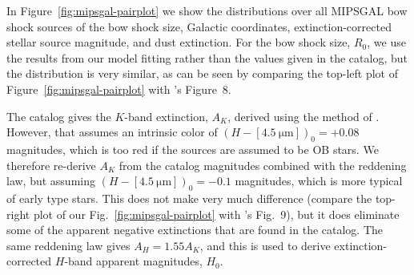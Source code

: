\documentclass[useAMS, usenatbib, a4paper]{mnras}
\begin{document}
In Figure~\ref{fig:mipsgal-pairplot} we show the distributions over
all MIPSGAL bow shock sources of the bow shock size, Galactic
coordinates, extinction-corrected stellar source magnitude, and dust
extinction.  For the bow shock size, \(R_0\), we use the results from
our model fitting rather than the values given in the
\citet{Kobulnicky:2016a} catalog, but the distribution is very
similar, as can be seen by comparing the top-left plot of
Figure~\ref{fig:mipsgal-pairplot} with \citeauthor{Kobulnicky:2016a}'s
Figure~8.

The catalog gives the \(K\)-band extinction, \(A_K\), derived using
the method of \citet{Majewski:2011a}. However, that assumes an
intrinsic color of \((H - [\SI{4.5}{\um}])_0 = +0.08\) magnitudes,
which is too red if the sources are assumed to be OB stars.  We
therefore re-derive \(A_K\) from the catalog magnitudes combined with
the \citet{Indebetouw:2005a} reddening law, but assuming
\((H - [\SI{4.5}{\um}])_0 = -0.1\) magnitudes, which is more typical
of early type stars.  This does not make very much difference (compare
the top-right plot of our Fig.~\ref{fig:mipsgal-pairplot} with
\citeauthor{Kobulnicky:2016a}'s Fig.~9), but it does eliminate some of
the apparent negative extinctions that are found in the catalog.  The
same reddening law gives \(A_H = 1.55 A_K\), and this is used to
derive extinction-corrected \(H\)-band apparent magnitudes, \(H_0\).
\end{document}
